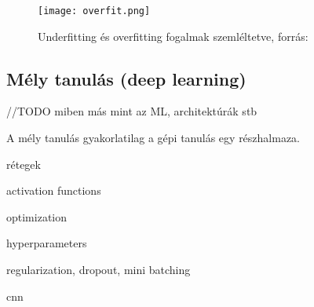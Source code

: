 \begin{figure}[H]
  \texttt{[image: overfit.png]}
  \caption{Underfitting és overfitting fogalmak szemléltetve, forrás: \cite{deeplearningbook} }
\end{figure}


\subsection{Mély tanulás (deep learning)}


//TODO  miben más mint az ML, architektúrák stb

A mély tanulás gyakorlatilag a gépi tanulás egy részhalmaza. 

rétegek

activation functions

optimization

hyperparameters

regularization, dropout, mini batching

cnn